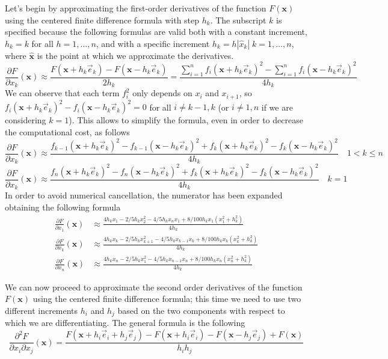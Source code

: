 Let's begin by approximating the first-order derivatives of the function $F(\mathbf{x})$ using the centered finite difference formula with step $h_k$. The subscript $k$ is specified because the following formulas are valid both with a constant increment, $h_k = k$ for all $h = 1, \dots, n$, and with a specific increment $h_k = h |\hat{x}_k| \; k= 1, \dots, n$, where $\mathbf{\hat{x}}$ is the point at which we approximate the derivatives.
$$ \frac{\partial F }{\partial x_k} (\mathbf{x}) \approx \frac{F(\mathbf{x} + h_k \vec{e}_k) - F(\mathbf{x} - h_k \vec{e}_k)}{2h_k} = 
\frac{\sum_{i = 1}^{n} f_i(\mathbf{x} + h_k \vec{e}_k)^2 - \sum_{i = 1}^{n} f_i(\mathbf{x} - h_k \vec{e}_k)^2}{4h_k}$$
We can observe that each term $f_i^2$ only depends on $x_i$ and $x_{i+1}$, so $f_i(\mathbf{x} + h_k\vec{e}_k)^2 - f_i(\mathbf{x} - h_k\vec{e}_k)^2 = 0$ for all $i \neq k-1, k$ (or $i \neq 1,n$ if we are considering $k = 1$). 
This allows to simplify the formula, even in order to decrease the computational cost, as follows
$$\frac{\partial F }{\partial x_k} (\mathbf{x}) \approx  \frac{f_{k-1}(\mathbf{x} + h_k\vec{e}_k)^2 - f_{k-1}(\mathbf{x} - h_k\vec{e}_k)^2 + f_{k}(\mathbf{x} + h_k\vec{e}_k)^2 - f_{k}(\mathbf{x} - h_k\vec{e}_k)^2}{4h_k}  \quad 1 < k \leq n$$
$$\frac{\partial F }{\partial x_k} (\mathbf{x}) \approx  \frac{f_{n}(\mathbf{x} + h_k\vec{e}_k)^2 - f_{n}(\mathbf{x} - h_k\vec{e}_k)^2 + f_{k}(\mathbf{x} + h_k\vec{e}_k)^2 - f_{k}(\mathbf{x} - h_k\vec{e}_k)^2}{4h_k}  \quad k = 1$$
In order to avoid numerical cancellation, the numerator has been expanded obtaining the following formula
\begin{align*}
    \frac{\partial F }{\partial x_1} (\mathbf{x}) & \approx \frac{4h_k x_1 - 2/5 h_k x_2^2 - 4/5 h_k x_n x_1 + 8/100 h_k x_1 (x_1^2 + h_k^2)}{4h_k} \\
    \frac{\partial F }{\partial x_k} (\mathbf{x}) & \approx \frac{4h_k x_k - 2/5 h_k x_{k+1}^2 - 4/5 h_k x_{k-1} x_k + 8/100 h_k x_k (x_k^2 + h_k^2)}{4h_k} \\
    \frac{\partial F }{\partial x_n} (\mathbf{x}) & \approx \frac{4h_k x_n - 2/5 h_k x_{1}^2 - 4/5 h_k x_{n-1} x_n + 8/100 h_k x_n (x_n^2 + h_k^2)}{4h_k}
\end{align*}


We can now proceed to approximate the second order derivatives of the function $F(\mathbf{x})$ using the centered finite difference formula; this time we need to use two different increments $h_i$ and $h_j$ based on the two components with respect to which we are differentiating.
The general formula is the following
$$ \frac{\partial^2 F}{\partial x_i \partial x_j} (\mathbf{x})  = \frac{F(\mathbf{x} + h_i \vec{e}_i + h_j \vec{e}_j) - F(\mathbf{x} + h_i \vec{e}_i) - F(\mathbf{x} - h_j \vec{e}_j) + F(\mathbf{x})}{h_i h_j}$$
